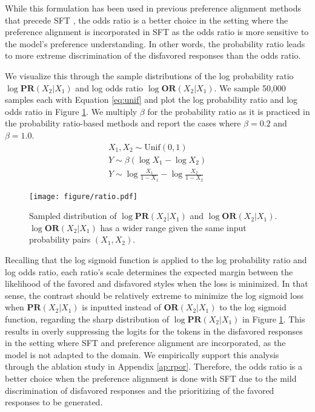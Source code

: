 While this formulation has been used in previous preference alignment methods that precede SFT \citep{rafailov2023direct, azar2023general}, the odds ratio is a better choice in the setting where the preference alignment is incorporated in SFT as the odds ratio is more sensitive to the model's preference understanding. In other words, the probability ratio leads to more extreme discrimination of the disfavored responses than the odds ratio.

We visualize this through the sample distributions of the log probability ratio $\log \textbf{PR}(X_2|X_1)$ and log odds ratio $\log \textbf{OR}(X_2|X_1)$. We sample 50,000 samples each with Equation \ref{eq:unif} and plot the log probability ratio and log odds ratio in Figure \ref{fig:compare}. We multiply $\beta$ for the probability ratio as it is practiced in the probability ratio-based methods and report the cases where $\beta=0.2$ and $\beta=1.0$.
\begin{gather}
    X_1, X_2 \sim \text{Unif}(0, 1)\label{eq:unif} \\
    Y \sim \beta \left( \log X_1 - \log X_2 \right)\label{eq:sample_prob} \\
    Y \sim \log \frac{X_1}{1 - X_1} - \log \frac{X_2}{1 - X_2}\label{eq:sample_odds}
\end{gather}
\begin{figure}[hbt!]
    \centering
    \texttt{[image: figure/ratio.pdf]}
    \caption{Sampled distribution of $\log \textbf{PR}(X_2|X_1)$ and $\log \textbf{OR}(X_2|X_1)$. $\log \textbf{OR}(X_2|X_1)$ has a wider range given the same input probability pairs $(X_1, X_2)$.}
    \label{fig:compare}
\end{figure}

Recalling that the log sigmoid function is applied to the log probability ratio and log odds ratio, each ratio's scale determines the expected margin between the likelihood of the favored and disfavored styles when the loss is minimized. In that sense, the contrast should be relatively extreme to minimize the log sigmoid loss when $\textbf{PR}(X_2|X_1)$ is inputted instead of $\textbf{OR}(X_2|X_1)$ to the log sigmoid function, regarding the sharp distribution of $\log \textbf{PR}(X_2|X_1)$ in Figure \ref{fig:compare}. This results in overly suppressing the logits for the tokens in the disfavored responses in the setting where SFT and preference alignment are incorporated, as the model is not adapted to the domain. We empirically support this analysis through the ablation study in Appendix \ref{ap:rpor}. Therefore, the odds ratio is a better choice when the preference alignment is done with SFT  due to the mild discrimination of disfavored responses and the prioritizing of the favored responses to be generated.

